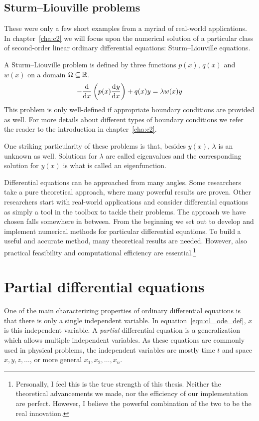 \subsection{Sturm--Liouville problems}

These were only a few short examples from a myriad of real-world applications. In chapter~\ref{cha:c2} we will focus upon the numerical solution of a particular class of second-order linear ordinary differential equations: Sturm--Liouville equations.

A Sturm--Liouville problem is defined by three functions $p(x)$, $q(x)$ and $w(x)$ on a domain $\Omega \subseteq \mathbb{R}$.
$$
    -{\dv[]{}{x}}\left(p(x) \dv[]{y}{x}\right) + q(x) y = \lambda w(x) y
$$
This problem is only well-defined if appropriate boundary conditions are provided as well. For more details about different types of boundary conditions we refer the reader to the introduction in chapter~\ref{cha:c2}.

One striking particularity of these problems is that, besides $y(x)$, $\lambda$ is an unknown as well. Solutions for $\lambda$ are called eigenvalues and the corresponding solution for $y(x)$ is what is called an eigenfunction.

Differential equations can be approached from many angles. Some researchers take a pure theoretical approach, where many powerful results are proven. Other researchers start with real-world applications and consider differential equations as simply a tool in the toolbox to tackle their problems. The approach we have chosen falls somewhere in between. From the beginning we set out to develop and implement numerical methods for particular differential equations. To build a useful and accurate method, many theoretical results are needed. However, also practical feasibility and computational efficiency are essential.\footnote{Personally, I feel this is the true strength of this thesis. Neither the theoretical advancements we made, nor the efficiency of our implementation are perfect. However, I believe the powerful combination of the two to be the real innovation.}


\section{Partial differential equations}

One of the main characterizing properties of ordinary differential equations is that there is only a single independent variable. In equation~\eqref{equ:c1_ode_def}, $x$ is this independent variable. A \emph{partial} differential equation is a generalization which allows multiple independent variables. As these equations are commonly used in physical problems, the independent variables are mostly time $t$ and space $x, y, z, \dots$, or more general $x_1, x_2, \dots, x_n$.

